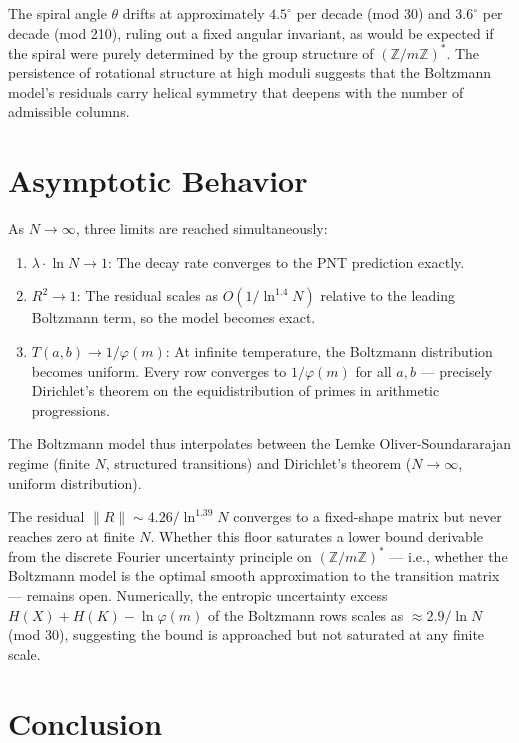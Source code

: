 \documentclass[
  11pt,
]{article}
\providecommand{\tightlist}{%
  \setlength{\itemsep}{0pt}\setlength{\parskip}{0pt}}
\begin{document}
The spiral angle \(\theta\) drifts at approximately \(4.5^\circ\) per decade
(mod 30) and \(3.6^\circ\) per decade (mod 210), ruling out a fixed angular
invariant, as would be expected if the spiral were purely determined by
the group structure of \((\mathbb{Z}/m\mathbb{Z})^*\). The persistence
of rotational structure at high moduli suggests that the Boltzmann
model's residuals carry helical symmetry that deepens with the number of
admissible columns.

\section{Asymptotic Behavior}\label{sec:asymptotic}

As \(N \to \infty\), three limits are reached simultaneously:

\begin{enumerate}
\def\labelenumi{\arabic{enumi}.}
\tightlist
\item
  \textbf{\(\lambda \cdot \ln N \to 1\)}: The decay rate converges to
  the PNT prediction exactly.
\item
  \textbf{\(R^2 \to 1\)}: The residual scales as \(O(1/\ln^{1.4} N)\)
  relative to the leading Boltzmann term, so the model becomes exact.
\item
  \textbf{\(T(a,b) \to 1/\varphi(m)\)}: At infinite temperature, the
  Boltzmann distribution becomes uniform. Every row converges to
  \(1/\varphi(m)\) for all \(a, b\) --- precisely Dirichlet's theorem on
  the equidistribution of primes in arithmetic progressions.
\end{enumerate}

The Boltzmann model thus interpolates between the Lemke
Oliver-Soundararajan regime (finite \(N\), structured transitions) and
Dirichlet's theorem (\(N \to \infty\), uniform distribution).

The residual \(\|R\| \sim 4.26/\ln^{1.39} N\) converges to a fixed-shape
matrix but never reaches zero at finite \(N\). Whether this floor
saturates a lower bound derivable from the discrete Fourier uncertainty
principle on \((\mathbb{Z}/m\mathbb{Z})^*\) --- i.e., whether the
Boltzmann model is the optimal smooth approximation to the transition
matrix --- remains open. Numerically, the entropic uncertainty excess
\(H(X) + H(K) - \ln \varphi(m)\) of the Boltzmann rows scales as
\(\approx 2.9/\ln N\) (mod 30), suggesting the bound is approached but
not saturated at any finite scale.

\section{Conclusion}\label{sec:conclusion}
\end{document}

